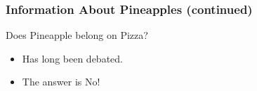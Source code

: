 \documentclass{beamer}
\begin{document}
\begin{frame}
    \frametitle{Information About Pineapples (continued)}

    \begin{alertblock}{Does Pineapple belong on Pizza?}
        \begin{itemize}
            \item Has long been debated. \pause
            \item The answer is \alert{No}!
        \end{itemize}

    \end{alertblock}

\end{frame}
\end{document}
